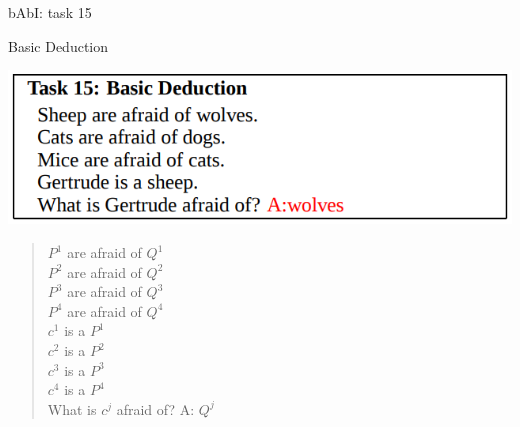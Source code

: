 \documentclass[10pt]{beamer}
\begin{document}
\begin{frame}{bAbI: task 15}

\alert{Basic Deduction}

\begin{center}
\includegraphics[scale=0.28]{images/babi15.png}
\end{center}
\begin{quote} 
\centering 
$P^{1}$ are afraid of $Q^{1}$\\
$P^{2}$ are afraid of $Q^{2}$\\
$P^{3}$ are afraid of $Q^{3}$\\
$P^{4}$ are afraid of $Q^{4}$\\
$c^{1}$ is a $P^{1}$\\
$c^{2}$ is a $P^{2}$\\
$c^{3}$ is a $P^{3}$\\
$c^{4}$ is a $P^{4}$\\
What is $c^j$ afraid of? \alert{A: $Q^j$}\\
\end{quote}


\end{frame}
\end{document}
